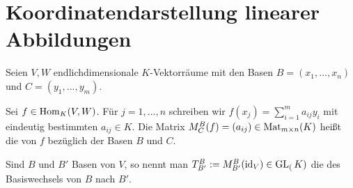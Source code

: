 \section{Koordinatendarstellung linearer Abbildungen}

Seien $V,W$ endlichdimensionale $K$-Vektorräume mit den Basen $B=(x_1,...,x_n)$ und $C=(y_1,...,y_m)$.

\begin{definition}
	Sei $f\in \operatorname{Hom}_K(V,W)$. Für $j=1,...,n$ schreiben wir $f(x_j)=\sum_{
		i=1}^m a_{ij}y_i$ mit eindeutig bestimmten $a_{ij}\in K$. Die Matrix $M_C^B(f)=(a_{ij})\in \operatorname{Mat}_{m\times n}(K)$ 
	heißt die  von $f$ bezüglich der Basen $B$ und $C$.
\end{definition}

\begin{definition}[Transformationsmatrix]
	Sind $B$ und $B'$ Basen von $V$, so nennt man $T_{B'}^B:=M_{B'}^B(\operatorname{id}_V)\in 
	\operatorname{GL}_(K)$ die  des Basiswechsels von $B$ nach $B'$.
\end{definition}